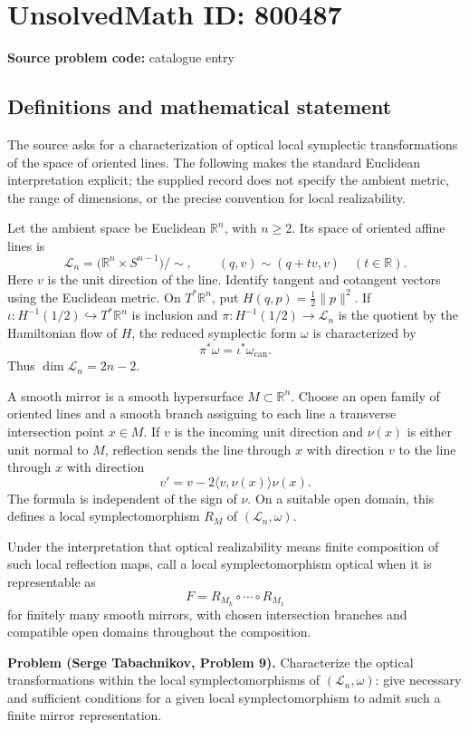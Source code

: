 \documentclass[11pt]{article}
\newcommand{\R}{\mathbb{R}}
\begin{document}
\section*{UnsolvedMath ID: 800487}
\textbf{Source problem code:} catalogue entry
\subsection{Definitions and mathematical statement}
The source asks for a characterization of optical local symplectic transformations of the space of oriented lines. The following makes the standard Euclidean interpretation explicit; the supplied record does not specify the ambient metric, the range of dimensions, or the precise convention for local realizability.

Let the ambient space be Euclidean \(\R^n\), with \(n\geq 2\). Its space of oriented affine lines is
\[
\mathcal L_n=\bigl(\R^n\times S^{n-1}\bigr)/\sim,
\qquad (q,v)\sim(q+tv,v)\quad(t\in\R).
\]
Here \(v\) is the unit direction of the line. Identify tangent and cotangent vectors using the Euclidean metric. On \(T^*\R^n\), put \(H(q,p)=\tfrac12\lVert p\rVert^2\). If \(\iota:H^{-1}(1/2)\hookrightarrow T^*\R^n\) is inclusion and \(\pi:H^{-1}(1/2)\to\mathcal L_n\) is the quotient by the Hamiltonian flow of \(H\), the reduced symplectic form \(\omega\) is characterized by
\[
\pi^*\omega=\iota^*\omega_{\mathrm{can}}.
\]
Thus \(\dim\mathcal L_n=2n-2\).

A smooth mirror is a smooth hypersurface \(M\subset\R^n\). Choose an open family of oriented lines and a smooth branch assigning to each line a transverse intersection point \(x\in M\). If \(v\) is the incoming unit direction and \(\nu(x)\) is either unit normal to \(M\), reflection sends the line through \(x\) with direction \(v\) to the line through \(x\) with direction
\[
v'=v-2\langle v,\nu(x)\rangle\nu(x).
\]
The formula is independent of the sign of \(\nu\). On a suitable open domain, this defines a local symplectomorphism \(R_M\) of \((\mathcal L_n,\omega)\).

Under the interpretation that optical realizability means finite composition of such local reflection maps, call a local symplectomorphism optical when it is representable as
\[
F=R_{M_k}\circ\cdots\circ R_{M_1}
\]
for finitely many smooth mirrors, with chosen intersection branches and compatible open domains throughout the composition.

\textbf{Problem (Serge Tabachnikov, Problem 9).} Characterize the optical transformations within the local symplectomorphisms of \((\mathcal L_n,\omega)\): give necessary and sufficient conditions for a given local symplectomorphism to admit such a finite mirror representation.
\end{document}
